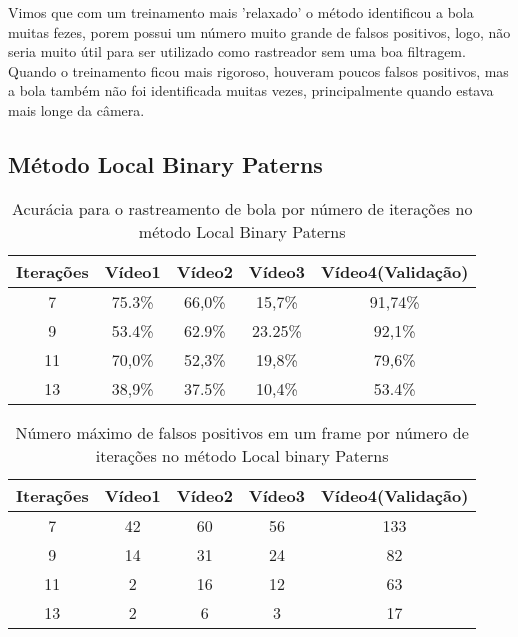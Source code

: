 \documentclass{bmvc2k}
\begin{document}
Vimos que com um treinamento mais 'relaxado' o método identificou a bola muitas fezes, porem possui um número muito grande de falsos positivos, logo, não seria muito útil para ser utilizado como rastreador sem uma boa filtragem. Quando o treinamento ficou mais rigoroso, houveram poucos falsos positivos, mas a bola também não foi identificada muitas vezes, principalmente quando estava mais longe da câmera.

\subsection{Método Local Binary Paterns}


\begin{table}[H]
\centering
\caption{Acurácia para o rastreamento de bola por número de iterações no método Local Binary Paterns}
\begin{tabular}{|c|c|c|c|c|}
\hline
Iterações & Vídeo1 & Vídeo2 & Vídeo3 & Vídeo4(Validação) \\ \hline
7         & 75.3\%             & 66,0\%            & 15,7\%             & 91,74\%     \\ \hline
9         & 53.4\%             & 62.9\%             & 23.25\%           & 92,1\%          \\ \hline
11        & 70,0\%            & 52,3\%            & 19,8\%             & 79,6\%           \\ \hline
13        & 38,9\%             & 37.5\%             & 10,4\%             & 53.4\%           \\ \hline
\end{tabular}
\end{table}


\begin{table}[H]
\centering
\caption{Número máximo de falsos positivos em um frame por número de iterações no método Local binary Paterns}
\begin{tabular}{|c|c|c|c|c|}
\hline
Iterações & Vídeo1 & Vídeo2 & Vídeo3 & Vídeo4(Validação) \\ \hline
7         &42             & 60             & 56             &    133      \\ \hline
9         & 14             & 31             &  24           & 82           \\ \hline
11        &  2             & 16             &12             & 63           \\ \hline
13        & 2              & 6              & 3              &  17           \\ \hline
\end{tabular}
\end{table}
\end{document}
